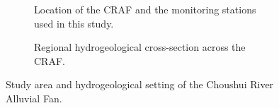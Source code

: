 \begin{figure}[p]
  \centering
  \begin{subfigure}[t]{0.50\textwidth}
    \centering
    \caption{Location of the CRAF and the monitoring stations used in this study.}
    \label{fig:studyarea_a}
  \end{subfigure}

  \vspace{0.6\baselineskip}

  \begin{subfigure}[t]{\textwidth}
    \centering
    \caption{Regional hydrogeological cross-section across the CRAF.}
    \label{fig:studyarea_b}
  \end{subfigure}
  \caption{Study area and hydrogeological setting of the Choushui River Alluvial Fan.}
  \label{fig:studyarea}
\end{figure}

\FloatBarrier

